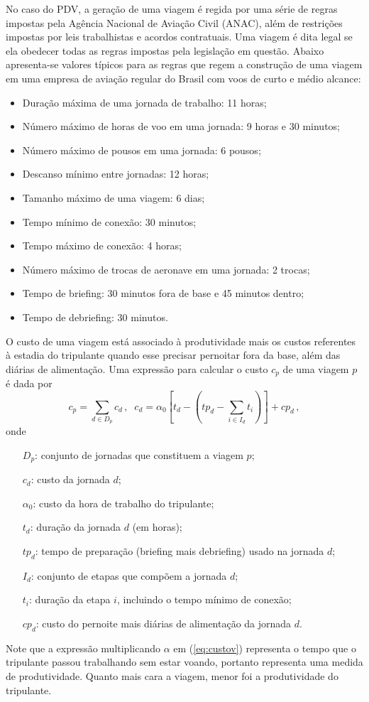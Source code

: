 \documentclass[12pt,a4paper]{article}
\newcommand{\ev}{\, ,}                                       %
\begin{document}
No caso do PDV, a geração de uma viagem é regida por uma série de regras impostas pela Agência
Nacional de Aviação Civil (ANAC), além de restrições impostas por leis trabalhistas e acordos
contratuais. Uma viagem é dita legal se ela obedecer todas as regras impostas pela legislação em
questão. Abaixo apresenta-se valores típicos para as regras que regem a construção de uma viagem em
uma empresa de aviação regular do Brasil com voos de curto e médio alcance:

\begin{itemize}
	\item Duração máxima de uma jornada de trabalho: 11 horas;
	\item Número máximo de horas de voo em uma jornada: 9 horas e 30 minutos;
	\item Número máximo de pousos em uma jornada: 6 pousos;
	\item Descanso mínimo entre jornadas: 12 horas;
	\item Tamanho máximo de uma viagem: 6 dias;
	\item Tempo mínimo de conexão: 30 minutos;
	\item Tempo máximo de conexão: 4 horas;
	\item Número máximo de trocas de aeronave em uma jornada: 2 trocas;
	\item Tempo de briefing: 30 minutos fora de base e 45 minutos dentro;
	\item Tempo de debriefing: 30 minutos.
\end{itemize}

O custo de uma viagem está associado à produtividade mais os custos referentes à estadia do 
tripulante quando esse precisar pernoitar fora da base, além das diárias de alimentação. Uma 
expressão para calcular o custo $c_p$ de uma viagem $p$ é dada por
%
\begin{equation} \label{eq:custov}
	c_p = \sum_{d \in D_p} c_d \, , \;\;
	c_d = \alpha_0 \left[t_d - \left(tp_d - \sum_{i \in I_d} t_i\right)\right] + cp_d \ev
\end{equation}
%
onde
%
\begin{itemize}
	\item[$D_p$:] conjunto de jornadas que constituem a viagem $p$;
	\item[$c_d$:] custo da jornada $d$;
	\item[$\alpha_0$:] custo da hora de trabalho do tripulante;
	\item[$t_d$:] duração da jornada $d$ (em horas);	
	\item[$tp_d$:] tempo de preparação (briefing mais debriefing) usado na jornada $d$;
	\item[$I_d$:] conjunto de etapas que compõem a jornada $d$;
	\item[$t_i$:] duração da etapa $i$, incluindo o tempo mínimo de conexão;
	\item[$cp_d$:] custo do pernoite mais diárias de alimentação da jornada $d$.
\end{itemize}
%
Note que a expressão multiplicando $\alpha$ em (\ref{eq:custov}) representa o tempo que o tripulante
passou trabalhando sem estar voando, portanto representa uma medida de produtividade. Quanto mais
cara a viagem, menor foi a produtividade do tripulante.
\end{document}
